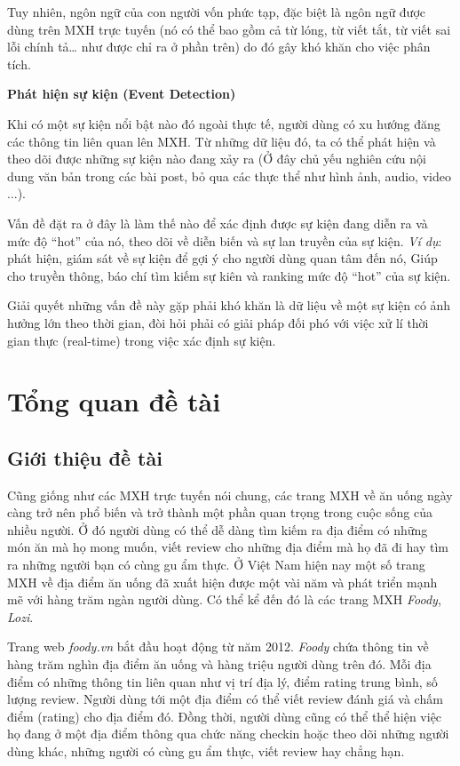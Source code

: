 \documentclass[12pt]{extarticle}
\begin{document}
			\par Tuy nhiên, ngôn ngữ của con người vốn phức tạp, đặc biệt là ngôn ngữ được dùng trên MXH trực tuyến (nó có thể bao gồm cả từ lóng, từ viết tắt, từ viết sai lỗi chính tả… như được chỉ ra ở phần trên) do đó gây khó khăn cho việc phân tích.
			\par \textbf{Phát hiện sự kiện (Event Detection)}
			\par Khi có một sự kiện nổi bật nào đó ngoài thực tế, người dùng có xu hướng đăng các thông tin liên quan lên MXH. Từ những dữ liệu đó, ta có thể phát hiện và theo dõi được những sự kiện nào đang xảy ra (Ở đây chủ yếu nghiên cứu nội dung văn bản trong các bài post, bỏ qua các thực thể như hình ảnh, audio, video ...).
			\par Vấn đề đặt ra ở đây là làm thế nào để xác định được sự kiện đang diễn ra và mức độ “hot” của nó, theo dõi về diễn biến và sự lan truyền của sự kiện. \textit{Ví dụ}: phát hiện, giám sát về sự kiện để gợi ý cho người dùng quan tâm đến nó, Giúp cho truyền thông, báo chí tìm kiếm sự kiên và ranking mức độ “hot” của sự kiện.
			\par Giải quyết những vấn đề này gặp phải khó khăn là dữ liệu về một sự kiện có ảnh hưởng lớn theo thời gian, đòi hỏi phải có giải pháp đối phó với việc xử lí thời gian thực (real-time) trong việc xác định sự kiện.
	
	\section{Tổng quan đề tài}
		\subsection{Giới thiệu đề tài}
			\par Cũng giống như các MXH trực tuyến nói chung, các trang MXH về ăn uống ngày càng trở nên phổ biến và trở thành một phần quan trọng trong cuộc sống của nhiều người. Ở đó người dùng có thể dễ dàng tìm kiếm ra địa điểm có những món ăn mà họ mong muốn, viết review cho những địa điểm mà họ đã đi hay tìm ra những người bạn có cùng gu ẩm thực. Ở Việt Nam hiện nay một số trang MXH về địa điểm ăn uống đã xuất hiện được một vài năm và phát triển mạnh mẽ với hàng trăm ngàn người dùng. Có thể kể đến đó là các trang MXH \textit{Foody}, \textit{Lozi}.
			\par Trang web \textit{foody.vn} bắt đầu hoạt động từ năm 2012. \textit{Foody} chứa thông tin về hàng trăm nghìn địa điểm ăn uống và hàng triệu người dùng trên đó. Mỗi địa điểm có những thông tin liên quan như vị trí địa lý, điểm rating trung bình, số lượng review. Người dùng tới một địa điểm có thể viết review đánh giá và chấm điểm (rating) cho địa điểm đó. Đồng thời, người dùng cũng có thể thể hiện việc họ đang ở một địa điểm thông qua chức năng checkin hoặc theo dõi những người dùng khác, những người có cùng gu ẩm thực, viết review hay chẳng hạn.
\end{document}
